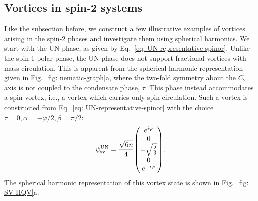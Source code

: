 \subsection{Vortices in spin-2 systems}\label{sec: vortices-spin-2}
Like the subsection before, we construct a few illustrative examples of vortices
arising in the spin-2 phases and investigate them using spherical harmonics.
We start with the UN phase, as given by
Eq.~\eqref{eq: UN-representative-spinor}.
Unlike the spin-1 polar phase, the UN phase does not support fractional vortices
with mass circulation.
This is apparent from the spherical harmonic representation given in
Fig.~\ref{fig: nematic-graph}a, where the two-fold symmetry
about the \(C_2\) axis is not coupled to the condensate phase, \(\tau \).
This phase instead accommodates a spin vortex, i.e., a vortex which carries only
spin circulation.
Such a vortex is constructed from Eq.~\eqref{eq: UN-representative-spinor} with
the choice \(\tau=0, \alpha=-\varphi/2, \beta=\pi/2\):
\begin{equation}
    \psi^\text{UN}_\text{sv} = \frac{\sqrt{6n}}{4}\mqty(
    e^{i\varphi} \\
    0 \\
    -\sqrt{\frac{2}{3}} \\
    0 \\ e^{-i\varphi}
    ).
\end{equation}
The spherical harmonic representation of this vortex state is shown in
Fig.~\ref{fig: SV-HQV}a.
